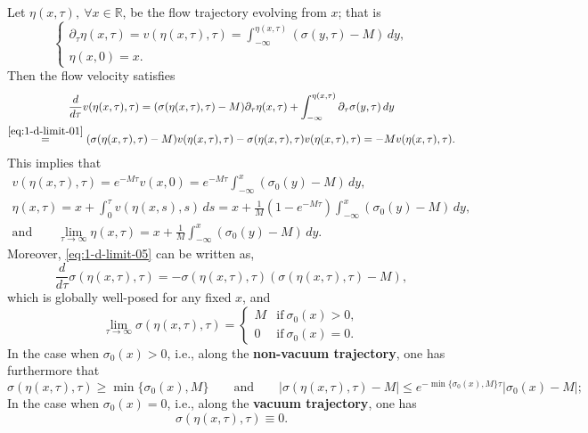 \documentclass[11pt]{article}
\theoremstyle{plain}
\theoremstyle{definition}
\theoremstyle{remark}
\newcommand{\dtau}{\partial_\tau}
\numberwithin{equation}{section}
\begin{document}
Let $ \eta(x,\tau), \ \forall x \in \mathbb{R} $, be the flow trajectory evolving from $ x $; that is
\begin{equation}
    \label{ene:901}
    \begin{cases}
        \dtau \eta(x,\tau) = v(\eta(x,\tau),\tau) = \int_{-\infty}^{\eta(x,\tau)} (\sigma(y, \tau) - M)\,dy, \\
        \eta(x,0) = x.
    \end{cases}
\end{equation}
Then the flow velocity satisfies
\begin{equation}
    \label{ene:902}
\begin{gathered}
    \dfrac{d}{d\tau} v(\eta(x,\tau),\tau) = (\sigma(\eta(x,\tau),\tau) - M) \dtau \eta(x,\tau) + \int_{-\infty}^{\eta(x,\tau)} \dtau \sigma(y,\tau) \,dy\\
    \stackrel{\eqref{eq:1-d-limit-01}}{=} (\sigma(\eta(x,\tau),\tau) - M) v(\eta(x,\tau),\tau) - \sigma(\eta(x,\tau),\tau) v(\eta(x,\tau),\tau) = - M v(\eta(x,\tau),\tau).
\end{gathered}
\end{equation}
This implies that 
\begin{gather}
    \label{ene:903}
    v(\eta(x,\tau),\tau) = e^{-M\tau} v(x,0) = e^{-M\tau} \int_{-\infty}^{x} (\sigma_0(y) - M) \,dy, \\
    \label{ene:903-1} 
    \eta(x,\tau) = x + \int_0^\tau v (\eta(x,s),s) \,ds = x + \frac{1}{M}(1 - e^{-M\tau})\int_{-\infty}^x(\sigma_0(y) - M)\,dy , \\
    \label{ene:904}
    \text{and} \qquad \lim_{\tau\rightarrow \infty} \eta(x,\tau) = x + \frac{1}{M} \int_{-\infty}^{x} (\sigma_0(y) - M)\,dy.
\end{gather}
Moreover, \eqref{eq:1-d-limit-05} can be written as,
\begin{equation}
    \label{ene:905}
    \dfrac{d}{d\tau} \sigma(\eta(x,\tau),\tau) = - \sigma(\eta(x,\tau),\tau) (\sigma(\eta(x,\tau),\tau)- M),
\end{equation}
which is globally well-posed for any fixed $ x $, and 
\begin{equation}
    \label{ene:906}
    \lim_{\tau\rightarrow \infty} \sigma(\eta(x,\tau),\tau) =
    \begin{cases}
    M & \text{if} \ \sigma_0(x) > 0, \\
    0 & \text{if} \ \sigma_0(x) = 0.
    \end{cases}
\end{equation}
In the case when $ \sigma_0(x) > 0 $, i.e., along the {\bf non-vacuum trajectory}, one has furthermore that 
\begin{equation}
    \label{ene:907}
    \sigma(\eta(x,\tau),\tau) \geq \min\lbrace\sigma_0(x),M \rbrace \qquad \text{and} \qquad
    \vert \sigma(\eta(x,\tau),\tau) - M \vert \leq e^{-\min\lbrace \sigma_0(x),M\rbrace \tau} \vert \sigma_0(x) - M \vert;
\end{equation}
In the case when $ \sigma_0(x) = 0 $, i.e., along the {\bf vacuum trajectory}, one has
\begin{equation}
    \label{ene:907-1}
    \sigma(\eta(x,\tau),\tau) \equiv 0.
\end{equation}
\end{document}
